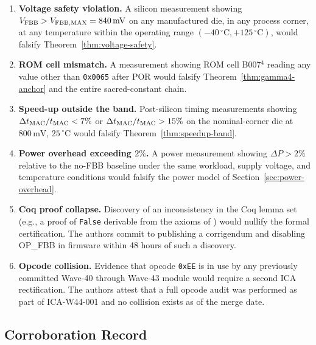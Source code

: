 \begin{enumerate}
  \item \textbf{Voltage safety violation.}
        A silicon measurement showing $V_{\mathrm{FBB}}{} > V_{\mathrm{FBB,MAX}}{} = 840\,\mathrm{mV}$
        on any manufactured die, in any process corner, at any temperature
        within the operating range $(-40\,^{\circ}\mathrm{C}, +125\,^{\circ}\mathrm{C})$,
        would falsify Theorem~\ref{thm:voltage-safety}.

  \item \textbf{ROM cell mismatch.}
        A measurement showing ROM cell B007$^{4}$ reading any value
        other than \texttt{0x0065} after POR would falsify
        Theorem~\ref{thm:gamma4-anchor} and the entire sacred-constant
        chain.

  \item \textbf{Speed-up outside the band.}
        Post-silicon timing measurements showing $\Delta t_{\mathrm{MAC}}/t_{\mathrm{MAC}} < 7\%$
        or $\Delta t_{\mathrm{MAC}}/t_{\mathrm{MAC}} > 15\%$ on the nominal-corner die at
        $800\,\mathrm{mV}$, $25\,^{\circ}\mathrm{C}$ would falsify
        Theorem~\ref{thm:speedup-band}.

  \item \textbf{Power overhead exceeding $2\%$.}
        A power measurement showing $\Delta P > 2\%$ relative to the
        no-FBB baseline under the same workload, supply voltage, and
        temperature conditions would falsify the power model of
        Section~\ref{sec:power-overhead}.

  \item \textbf{Coq proof collapse.}
        Discovery of an inconsistency in the Coq lemma set
        (e.g., a proof of \texttt{False} derivable from the axioms
        of \coqfile{}) would nullify the formal certification.
        The authors commit to publishing a corrigendum and disabling
        OP\_FBB in firmware within 48 hours of such a discovery.

  \item \textbf{Opcode collision.}
        Evidence that opcode \texttt{0xEE} is in use by any
        previously committed Wave-40 through Wave-43 module would
        require a second ICA rectification.  The authors attest that
        a full opcode audit was performed as part of ICA-W44-001 and
        no collision exists as of the merge date.
\end{enumerate}

\subsection{Corroboration Record}
\label{subsec:corroboration}

